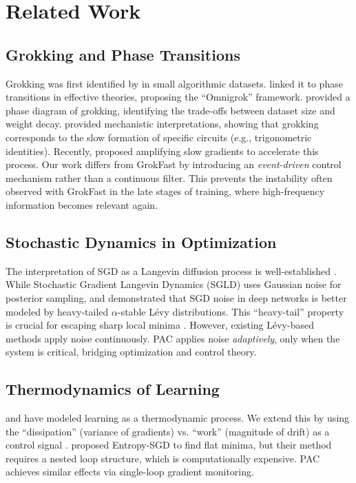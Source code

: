 \documentclass{article}
\theoremstyle{plain}
\theoremstyle{definition}
\theoremstyle{remark}
\begin{document}
\section{Related Work}
\label{sec:related}

\subsection{Grokking and Phase Transitions}
Grokking was first identified by \citet{power2022grokking} in small algorithmic datasets. \citet{liu2024omnigrok} linked it to phase transitions in effective theories, proposing the ``Omnigrok'' framework. \citet{zimerman2023phase} provided a phase diagram of grokking, identifying the trade-offs between dataset size and weight decay. \citet{nanda2023progress} provided mechanistic interpretations, showing that grokking corresponds to the slow formation of specific circuits (e.g., trigonometric identities). Recently, \citet{merrill2024grokfast} proposed amplifying slow gradients to accelerate this process. Our work differs from GrokFast by introducing an \textit{event-driven} control mechanism rather than a continuous filter. This prevents the instability often observed with GrokFast in the late stages of training, where high-frequency information becomes relevant again.

\subsection{Stochastic Dynamics in Optimization}
The interpretation of SGD as a Langevin diffusion process is well-established \cite{welling2011bayesian, mandt2017stochastic}. While Stochastic Gradient Langevin Dynamics (SGLD) uses Gaussian noise for posterior sampling, \citet{simsekli2019tail} and \citet{zhou2023levy} demonstrated that SGD noise in deep networks is better modeled by heavy-tailed $\alpha$-stable Lévy distributions. This ``heavy-tail'' property is crucial for escaping sharp local minima \cite{gurbuzbalaban2021heavy}. However, existing Lévy-based methods \cite{zhou2023levy} apply noise continuously. PAC applies noise \textit{adaptively}, only when the system is critical, bridging optimization and control theory.

\subsection{Thermodynamics of Learning}
\citet{sohldickstein2015deep} and \citet{alemi2024thermodynamics} have modeled learning as a thermodynamic process. We extend this by using the ``dissipation'' (variance of gradients) vs. ``work'' (magnitude of drift) as a control signal \cite{landauer1961irreversibility}. \citet{chaudhari2018entropy} proposed Entropy-SGD to find flat minima, but their method requires a nested loop structure, which is computationally expensive. PAC achieves similar effects via single-loop gradient monitoring.
\end{document}
